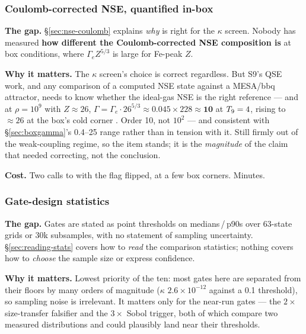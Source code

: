 \subsubsection{Coulomb-corrected NSE, quantified in-box}
\label{sec:gap-nse}

\textbf{The gap.} \S\ref{sec:nse-coulomb} explains \emph{why}
 is right for the $\kappa$ screen. Nobody has
measured \textbf{how different the Coulomb-corrected NSE composition is} at box
conditions, where $\Gamma_e Z^{5/3}$ is large for Fe-peak $Z$.

\textbf{Why it matters.} The $\kappa$ screen's choice is correct regardless. But
S9's QSE work, and any comparison of a computed NSE state against a MESA/bbq
attractor, needs to know whether the ideal-gas NSE is the right reference ---
and at $\rho = 10^9$ with $Z \approx 26$,
$\Gamma = \Gamma_e\cdot26^{5/3} \approx 0.045 \times 228 \approx \mathbf{10}$ at
$T_{9} = 4$, rising to $\approx 26$ at the box's cold corner \derivedhere{}. Order
10, not $10^2$ --- and consistent with \S\ref{sec:boxgamma}'s 0.4--25 range
rather than in tension with it. Still firmly out of the weak-coupling regime, so
the item stands; it is the \emph{magnitude} of the claim that needed correcting,
not the conclusion.

\textbf{Cost.} Two calls to  with the flag flipped, at a
few box corners. Minutes.

\subsubsection{Gate-design statistics}
\label{sec:gap-gatestats}

\textbf{The gap.} Gates are stated as point thresholds on medians\,/\,p90s over
63-state grids or 30k subsamples, with no statement of sampling uncertainty.
\S\ref{sec:reading-stats} covers how to \emph{read} the comparison statistics;
nothing covers how to \emph{choose} the sample size or express confidence.

\textbf{Why it matters.} Lowest priority of the ten: most gates here are
separated from their floors by many orders of magnitude ($\kappa$
$2.6\times10^{-12}$ against a 0.1 threshold), so sampling noise is irrelevant.
It matters only for the near-run gates --- the $2\times$ size-transfer falsifier
and the $3\times$ Sobol trigger, both of which compare two measured
distributions and could plausibly land near their thresholds.

